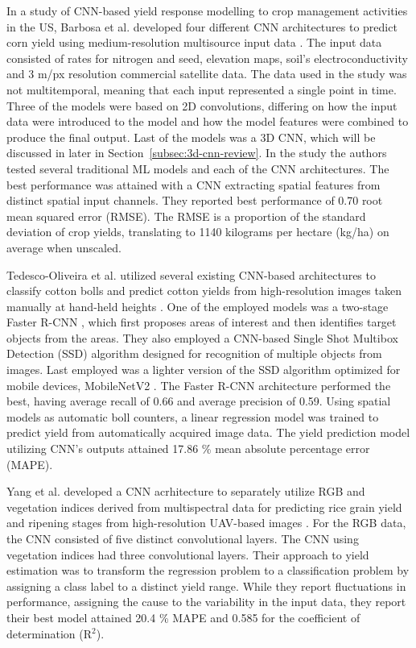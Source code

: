 In a study of CNN-based yield response modelling to crop management activities in the US, Barbosa et al. developed four different CNN architectures to predict corn yield using medium-resolution multisource input data \cite{Barbosa2020}. The input data consisted of rates for nitrogen and seed, elevation maps, soil's electroconductivity and 3 m/px resolution commercial satellite data. The data used in the study was not multitemporal, meaning that each input represented a single point in time. Three of the models were based on 2D convolutions, differing on how the input data were introduced to the model and how the model features were combined to produce the final output. Last of the models was a 3D CNN, which will be discussed in later in Section~\ref{subsec:3d-cnn-review}. In the study the authors tested several traditional ML models and each of the CNN architectures. The best performance was attained with a CNN extracting spatial features from distinct spatial input channels. They reported best performance of 0.70 root mean squared error (RMSE). The RMSE is a proportion of the standard deviation of crop yields, translating to 1140 kilograms per hectare (kg/ha) on average when unscaled.

Tedesco-Oliveira et al. utilized several existing CNN-based architectures to classify cotton bolls and predict cotton yields from high-resolution images taken manually at hand-held heights \cite{Tedesco-Oliveira2020}. One of the employed models was a two-stage Faster R-CNN \cite{Ren2017}, which first proposes areas of interest and then identifies target objects from the areas. They also employed a CNN-based Single Shot Multibox Detection (SSD)\cite{Liu2016} algorithm designed for recognition of multiple objects from images. Last employed was a lighter version of the SSD algorithm optimized for mobile devices, MobileNetV2 \cite{Sandler2018}. The Faster R-CNN architecture performed the best, having average recall of 0.66 and average precision of 0.59. Using spatial models as automatic boll counters, a linear regression model was trained to predict yield from automatically acquired image data. The yield prediction model utilizing CNN's outputs attained 17.86 \% mean absolute percentage error (MAPE).

Yang et al. developed a CNN acrhitecture to separately utilize RGB and vegetation indices derived from multispectral data for predicting rice grain yield and ripening stages from high-resolution UAV-based images \cite{Yang2019}. For the RGB data, the CNN consisted of five distinct convolutional layers. The CNN using vegetation indices had three convolutional layers. Their approach to yield estimation was to transform the regression problem to a classification problem by assigning a class label to a distinct yield range. While they report fluctuations in performance, assigning the cause to the variability in the input data, they report their best model attained 20.4 \% MAPE and 0.585 for the coefficient of determination (R$^2$).

